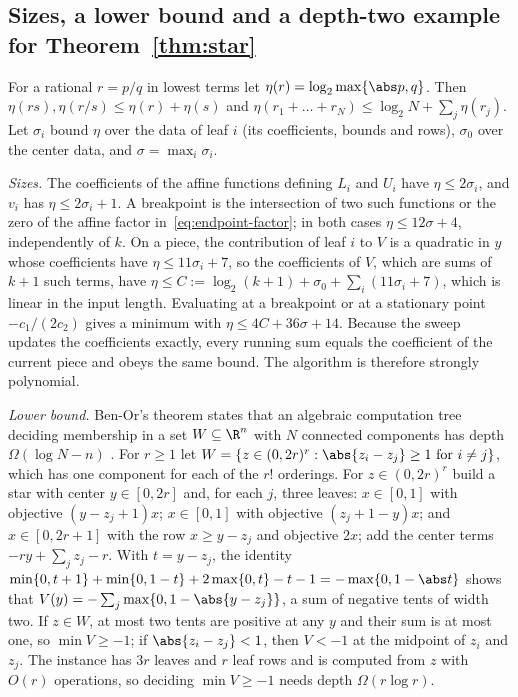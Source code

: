 \subsection{Sizes, a lower bound and a depth-two example for Theorem~\ref{thm:star}}\label{app:star}

For a rational $r=p/q$ in lowest terms let $\eta(r)=\log_2\max\{\abs p,q\}$.
Then $\eta(rs),\eta(r/s)\le\eta(r)+\eta(s)$ and
$\eta(r_1+\dots+r_N)\le\log_2N+\sum_j\eta(r_j)$. Let $\sigma_i$ bound $\eta$
over the data of leaf $i$ (its coefficients, bounds and rows), $\sigma_0$
over the center data, and $\sigma=\max_i\sigma_i$.

\emph{Sizes.} The coefficients of the affine functions defining $L_i$ and
$U_i$ have $\eta\le2\sigma_i$, and $v_i$ has $\eta\le2\sigma_i+1$. A breakpoint is
the intersection of two such functions or the zero of the affine factor
in~\eqref{eq:endpoint-factor}; in both cases $\eta\le12\sigma+4$, independently
of $k$. On a piece, the contribution of leaf $i$ to $V$ is a quadratic in
$y$ whose coefficients have $\eta\le11\sigma_i+7$, so the coefficients of $V$,
which are sums of $k+1$ such terms, have $\eta\le C:=\log_2(k+1)+\sigma_0+\sum_i(11\sigma_i+7)$,
which is linear in the input length. Evaluating at a breakpoint or at a
stationary point $-c_1/(2c_2)$ gives a minimum with $\eta\le4C+36\sigma+14$.
Because the sweep updates the coefficients exactly, every running sum
equals the coefficient of the current piece and obeys the same bound. The
algorithm is therefore strongly polynomial.

\emph{Lower bound.} Ben-Or's theorem states that an algebraic computation
tree deciding membership in a set $W\subseteq\R^n$ with $N$ connected
components has depth $\Omega(\log N-n)$ \citep{BenOr1983}. For $r\ge1$ let
$W=\{z\in(0,2r)^r:\abs{z_i-z_j}\ge1\ \text{for}\ i\ne j\}$, which has one
component for each of the $r!$ orderings. For $z\in(0,2r)^r$ build a star
with center $y\in[0,2r]$ and, for each $j$, three leaves: $x\in[0,1]$ with
objective $(y-z_j+1)x$; $x\in[0,1]$ with objective $(z_j+1-y)x$; and
$x\in[0,2r+1]$ with the row $x\ge y-z_j$ and objective $2x$; add the center
terms $-ry+\sum_jz_j-r$. With $t=y-z_j$, the identity
$\min\{0,t+1\}+\min\{0,1-t\}+2\max\{0,t\}-t-1=-\max\{0,1-\abs t\}$ shows that
$V(y)=-\sum_j\max\{0,1-\abs{y-z_j}\}$, a sum of negative tents of width two.
If $z\in W$, at most two tents are positive at any $y$ and their sum is at
most one, so $\min V\ge-1$; if $\abs{z_i-z_j}<1$, then $V<-1$ at the midpoint of
$z_i$ and $z_j$. The instance has $3r$ leaves and $r$ leaf rows and is
computed from $z$ with $O(r)$ operations, so deciding $\min V\ge-1$ needs
depth $\Omega(r\log r)$.

